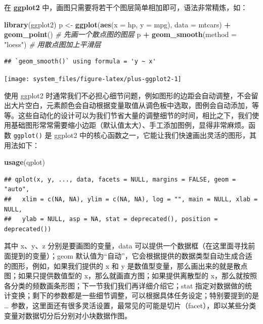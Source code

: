 \documentclass[
  b5paper,
  UTF8,twoside]{book}
\newenvironment{Shaded}{\begin{snugshade}}{\end{snugshade}}
\newcommand{\AttributeTok}[1]{\textcolor[rgb]{0.13,0.29,0.53}{#1}}
\newcommand{\CommentTok}[1]{\textcolor[rgb]{0.56,0.35,0.01}{\textit{#1}}}
\newcommand{\FunctionTok}[1]{\textcolor[rgb]{0.13,0.29,0.53}{\textbf{#1}}}
\newcommand{\NormalTok}[1]{#1}
\newcommand{\OtherTok}[1]{\textcolor[rgb]{0.56,0.35,0.01}{#1}}
\newcommand{\SpecialCharTok}[1]{\textcolor[rgb]{0.81,0.36,0.00}{\textbf{#1}}}
\newcommand{\StringTok}[1]{\textcolor[rgb]{0.31,0.60,0.02}{#1}}
\begin{document}
在 \textbf{ggplot2} 中，画图只需要将若干个图层简单相加即可，语法非常精炼，如：

\begin{Shaded}
\begin{Highlighting}[]
\FunctionTok{library}\NormalTok{(ggplot2)}
\NormalTok{p }\OtherTok{\textless{}{-}} \FunctionTok{ggplot}\NormalTok{(}\FunctionTok{aes}\NormalTok{(}\AttributeTok{x =}\NormalTok{ hp, }\AttributeTok{y =}\NormalTok{ mpg), }\AttributeTok{data =}\NormalTok{ mtcars) }\SpecialCharTok{+}
  \FunctionTok{geom\_point}\NormalTok{() }\CommentTok{\# 先画一个散点图的图层}
\NormalTok{p }\SpecialCharTok{+} \FunctionTok{geom\_smooth}\NormalTok{(}\AttributeTok{method =} \StringTok{"loess"}\NormalTok{) }\CommentTok{\# 用散点图加上平滑层}
\end{Highlighting}
\end{Shaded}

\begin{verbatim}
## `geom_smooth()` using formula = 'y ~ x'
\end{verbatim}

\begin{center}\texttt{[image: system\_files/figure-latex/plus-ggplot2-1]} \end{center}

使用 ggplot2 时通常我们不必担心细节问题，例如图形的边距会自动调整，不会留出大片空白，元素颜色会自动根据变量取值从调色板中选取，图例会自动添加，等等。这些自动化的设计可以为我们节省大量的调整细节的时间，相比之下，我们使用基础图形常常需要缩小边距（默认值太大）、手工添加图例，显得非常麻烦。函数 \texttt{ggplot()} 是 ggplot2 中的核心函数之一，它能让我们快速画出灵活的图形，其用法如下：

\begin{Shaded}
\begin{Highlighting}[]
\FunctionTok{usage}\NormalTok{(qplot)}
\end{Highlighting}
\end{Shaded}

\begin{verbatim}
## qplot(x, y, ..., data, facets = NULL, margins = FALSE, geom = "auto",
##   xlim = c(NA, NA), ylim = c(NA, NA), log = "", main = NULL, xlab = NULL,
##   ylab = NULL, asp = NA, stat = deprecated(), position = deprecated())
\end{verbatim}

其中 x、y、z 分别是要画图的变量，data 可以提供一个数据框（在这里面寻找前面提到的变量）；geom 默认值为``自动''，它会根据提供的数据类型自动生成合适的图形，例如，如果我们提供的 x 和 y 是数值型变量，那么画出来的就是散点图；如果只提供数值型的 x，那么就画直方图；如果提供离散型的 x，那么就按照各分类的频数画条形图；下一节我们我们再详细介绍它；stat 指定对数据做的统计变换；剩下的参数都是一些细节调整，可以根据具体任务设定；特别要提到的是 \ldots{} 参数，这里面还有很多灵活设置，最常见的可能是切片（facet），即以某些分类变量对数据切分后分别对小块数据作图。
\end{document}
